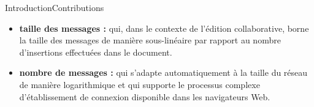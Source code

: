 \begin{frame}{Introduction}{Contributions}
  
  
  \begin{itemize}
  \item \textbf{taille des messages :} \LSEQ qui, dans le contexte de l'édition
    collaborative, borne la taille des messages de manière sous-linéaire par
    rapport au nombre d'insertions effectuées dans le document.
    \vspace{1cm}
  \item \textbf{nombre de messages :} \SPRAY qui s'adapte automatiquement à la
    taille du réseau de manière logarithmique et qui supporte le processus
    complexe d'établissement de connexion disponible dans les navigateurs Web.
  \end{itemize}

\end{frame}


  



  




